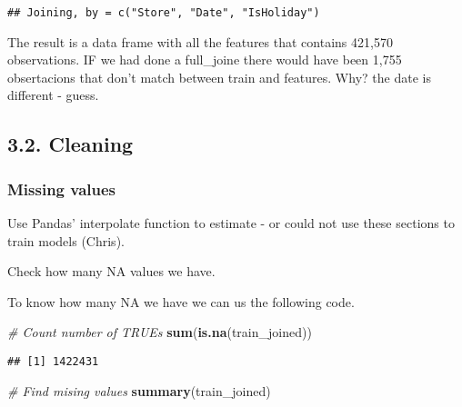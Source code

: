 \documentclass[11pt,]{article}
\newenvironment{Shaded}{\begin{snugshade}}{\end{snugshade}}
\newcommand{\KeywordTok}[1]{\textcolor[rgb]{0.13,0.29,0.53}{\textbf{{#1}}}}
\newcommand{\CommentTok}[1]{\textcolor[rgb]{0.56,0.35,0.01}{\textit{{#1}}}}
\newcommand{\NormalTok}[1]{{#1}}
\begin{document}
\begin{verbatim}
## Joining, by = c("Store", "Date", "IsHoliday")
\end{verbatim}

The result is a data frame with all the features that contains 421,570
observations. IF we had done a full\_joine there would have been 1,755
obsertacions that don't match between train and features. Why? the date
is different - guess.

\subsection{3.2. Cleaning}\label{cleaning}

\subsubsection{Missing values}\label{missing-values}

Use Pandas' interpolate function to estimate - or could not use these
sections to train models (Chris).

Check how many NA values we have.

To know how many NA we have we can us the following code.

\begin{Shaded}
\begin{Highlighting}[]
\CommentTok{# Count number of TRUEs}
\KeywordTok{sum}\NormalTok{(}\KeywordTok{is.na}\NormalTok{(train_joined))}
\end{Highlighting}
\end{Shaded}

\begin{verbatim}
## [1] 1422431
\end{verbatim}

\begin{Shaded}
\begin{Highlighting}[]
\CommentTok{# Find mising values}
\KeywordTok{summary}\NormalTok{(train_joined)}
\end{Highlighting}
\end{Shaded}
\end{document}
